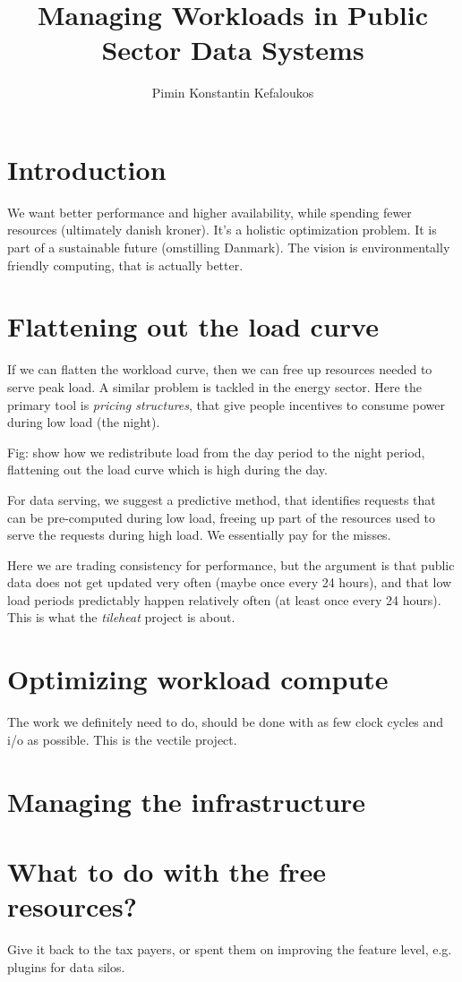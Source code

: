 \documentclass[11pt]{amsart}
\title{Managing Workloads in Public Sector Data Systems}
\author{Pimin Konstantin Kefaloukos}
\begin{document}
\maketitle
\section{Introduction}
We want better performance and higher availability, while spending fewer resources (ultimately danish kroner). It's a holistic optimization problem. It is part of a sustainable future (omstilling Danmark). The vision is environmentally friendly computing, that is actually better.

\section{Flattening out the load curve}
If we can flatten the workload curve, then we can free up resources needed to serve peak load. A similar problem is tackled in the energy sector. Here the primary tool is \emph{pricing structures}, that give people incentives to consume power during low load (the night).

Fig: show how we redistribute load from the day period to the night period, flattening out the load curve which is high during the day.

For data serving, we suggest a predictive method, that identifies requests that can be pre-computed during low load, freeing up part of the resources used to serve the requests during high load. We essentially pay for the misses.

Here we are trading consistency for performance, but the argument is that public data does not get updated very often (maybe once every 24 hours), and that low load periods predictably happen relatively often (at least once every 24 hours). This is what the \emph{tileheat} project is about.



\section{Optimizing workload compute}
The work we definitely need to do, should be done with as few clock cycles and i/o as possible. This is the vectile project.

\section{Managing the infrastructure}



\section{What to do with the free resources?}
Give it back to the tax payers, or spent them on improving the feature level, e.g. plugins for data silos.

\end{document}
